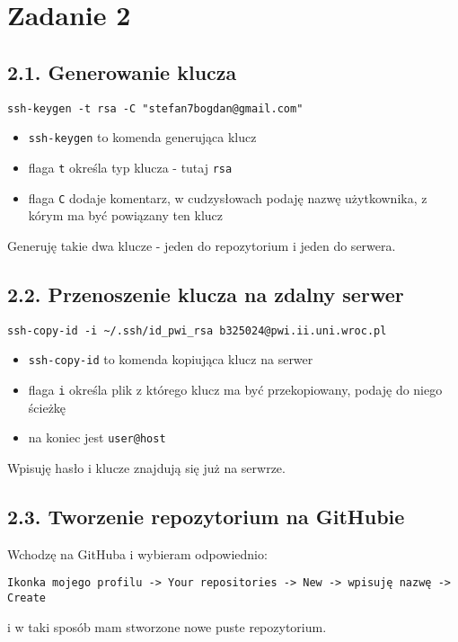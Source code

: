 \documentclass[a4paper, 11pt]{article}
\begin{document}
\section*{Zadanie 2}

\subsection*{2.1. Generowanie klucza}
\begin{verbatim}
ssh-keygen -t rsa -C "stefan7bogdan@gmail.com"
\end{verbatim}
\begin{itemize}
    \item \verb+ssh-keygen+ to komenda generująca klucz
    \item flaga \verb+t+ określa typ klucza - tutaj \verb+rsa+
    \item flaga \verb+C+ dodaje komentarz, w cudzysłowach podaję nazwę użytkownika, z kórym ma być powiązany ten klucz
\end{itemize}
Generuję takie dwa klucze - jeden do repozytorium i jeden do serwera.

\subsection*{2.2. Przenoszenie klucza na zdalny serwer}
\begin{verbatim}
ssh-copy-id -i ~/.ssh/id_pwi_rsa b325024@pwi.ii.uni.wroc.pl
\end{verbatim}
\begin{itemize}
    \item \verb+ssh-copy-id+ to komenda kopiująca klucz na serwer
    \item flaga \verb+i+ określa plik z którego klucz ma być przekopiowany, podaję do niego ścieżkę
    \item na koniec jest \verb+user@host+
\end{itemize}
Wpisuję hasło i klucze znajdują się już na serwrze.\\

\subsection*{2.3. Tworzenie repozytorium na GitHubie}
Wchodzę na GitHuba i wybieram odpowiednio:
\begin{verbatim}
Ikonka mojego profilu -> Your repositories -> New -> wpisuję nazwę -> Create 
\end{verbatim}
i w taki sposób mam stworzone nowe puste repozytorium.
\end{document}
